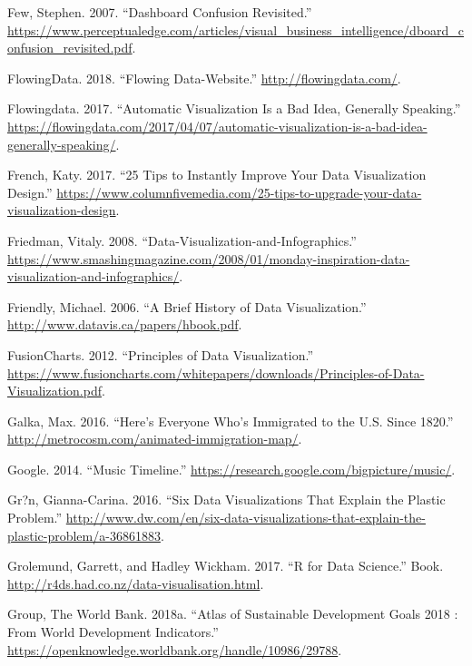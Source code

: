 \documentclass[]{book}
\begin{document}
\hypertarget{ref-dashboard}{}
Few, Stephen. 2007. ``Dashboard Confusion Revisited.''
\url{https://www.perceptualedge.com/articles/visual_business_intelligence/dboard_confusion_revisited.pdf}.

\hypertarget{ref-flowingdata}{}
FlowingData. 2018. ``Flowing Data-Website.''
\url{http://flowingdata.com/}.

\hypertarget{ref-auto_viz}{}
Flowingdata. 2017. ``Automatic Visualization Is a Bad Idea, Generally
Speaking.''
\url{https://flowingdata.com/2017/04/07/automatic-visualization-is-a-bad-idea-generally-speaking/}.

\hypertarget{ref-French}{}
French, Katy. 2017. ``25 Tips to Instantly Improve Your Data
Visualization Design.''
\url{https://www.columnfivemedia.com/25-tips-to-upgrade-your-data-visualization-design}.

\hypertarget{ref-viz}{}
Friedman, Vitaly. 2008. ``Data-Visualization-and-Infographics.''
\url{https://www.smashingmagazine.com/2008/01/monday-inspiration-data-visualization-and-infographics/}.

\hypertarget{ref-data_viz_history}{}
Friendly, Michael. 2006. ``A Brief History of Data Visualization.''
\url{http://www.datavis.ca/papers/hbook.pdf}.

\hypertarget{ref-principles-fusioncharts}{}
FusionCharts. 2012. ``Principles of Data Visualization.''
\url{https://www.fusioncharts.com/whitepapers/downloads/Principles-of-Data-Visualization.pdf}.

\hypertarget{ref-immigration}{}
Galka, Max. 2016. ``Here's Everyone Who's Immigrated to the U.S. Since
1820.'' \url{http://metrocosm.com/animated-immigration-map/}.

\hypertarget{ref-google_music}{}
Google. 2014. ``Music Timeline.''
\url{https://research.google.com/bigpicture/music/}.

\hypertarget{ref-plastic_pollution_visualizations}{}
Gr?n, Gianna-Carina. 2016. ``Six Data Visualizations That Explain the
Plastic Problem.''
\url{http://www.dw.com/en/six-data-visualizations-that-explain-the-plastic-problem/a-36861883}.

\hypertarget{ref-Grammar_Graphics}{}
Grolemund, Garrett, and Hadley Wickham. 2017. ``R for Data Science.''
Book. \url{http://r4ds.had.co.nz/data-visualisation.html}.

\hypertarget{ref-worldbankpub}{}
Group, The World Bank. 2018a. ``Atlas of Sustainable Development Goals
2018 : From World Development Indicators.''
\url{https://openknowledge.worldbank.org/handle/10986/29788}.
\end{document}
